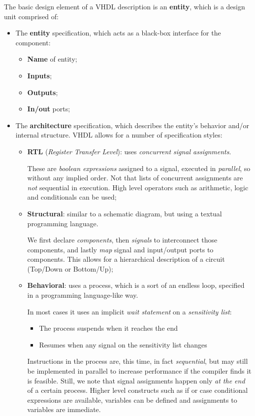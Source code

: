 \documentclass[a4paper,11pt]{article}
\begin{document}
The basic design element of a VHDL description is an \textbf{entity}, which is a design unit comprised of:
\begin{itemize}
	\item The \textbf{entity} specification, which acts as a black-box interface for the component:
	      \begin{itemize}
		      \item \textbf{Name} of entity;
		      \item \textbf{Inputs};
		      \item \textbf{Outputs};
		      \item \textbf{In/out} ports;
	      \end{itemize}
	\item The \textbf{architecture} specification, which describes the entity's behavior and/or internal structure. VHDL allows for a number of specification styles:
	      \begin{itemize}
		      \item \textbf{RTL} (\textit{Register Transfer Level}): uses \textit{concurrent signal assignments}.

		            These are \textit{boolean expressions} assigned to a signal, executed in \textit{parallel}, so without any implied order. Not that lists of concurrent assignments are \textit{not} sequential in execution. High level operators such as arithmetic, logic and conditionals can be used;
		      \item \textbf{Structural}: similar to a schematic diagram, but using a textual programming language.

		            We first declare \textit{components}, then \textit{signals} to interconnect those components, and lastly \textit{map} signal and input/output ports to components. This allows for a hierarchical description of a circuit (Top/Down or Bottom/Up);
		      \item \textbf{Behavioral}: uses a process, which is a sort of an endless loop, specified in a programming language-like way.

		            In most cases it uses an implicit \textit{wait statement} on a \textit{sensitivity list}:
		            \begin{itemize}
			            \item The process suspends when it reaches the end
			            \item Resumes when any signal on the sensitivity list changes
		            \end{itemize}
		            Instructions in the process are, this time, in fact \textit{sequential}, but may still be implemented in parallel to increase performance if the compiler finds it is feasible.
		            Still, we note that signal assignments happen only \textit{at the end} of a certain process.
		            Higher level constructs such as if or case conditional expressions are available, variables can be defined and assignments to variables are immediate.
	      \end{itemize}
\end{itemize}
\end{document}
